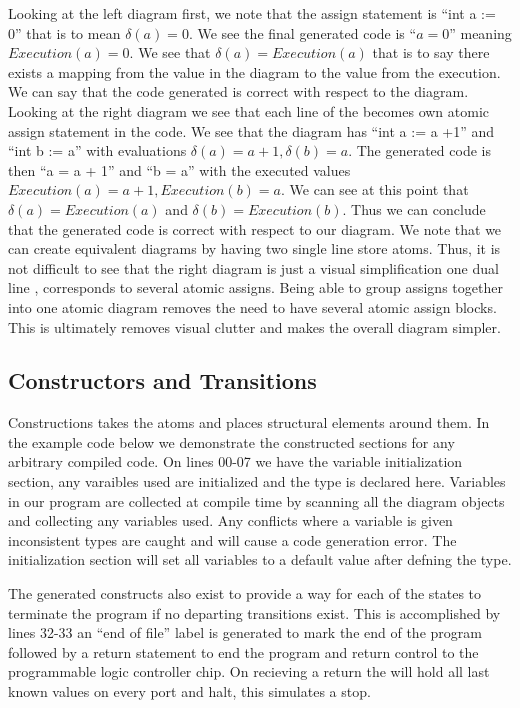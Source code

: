 Looking at the left diagram first, we note that the assign statement is ``int a := 0'' 
that is to mean $\delta(a) = 0$. We see the final generated code is ``$a = 0$'' 
meaning $Execution(a) = 0$. We see that $\delta(a) = Execution(a)$ that is to 
say there exists a mapping from the value in the diagram to the value from the execution. 
We can say that the code generated is correct with respect to the diagram. 
Looking at the right diagram we see that each line of the  
becomes own atomic assign statement in the code. We see that the diagram 
has ``int a := a +1'' and ``int b := a'' with evaluations $\delta(a) = a + 1, \delta(b) = a$. 
The generated code is then ``a = a + 1'' and ``b = a'' with the executed values 
$Execution(a) = a + 1, Execution(b) = a$. We can see at this point that $\delta(a) = Execution(a)$ 
and $\delta(b) = Execution(b)$. Thus we can conclude that the  
generated code is correct with respect to our diagram. We note that we can create equivalent 
diagrams by having two single line store atoms. 
Thus, it is not difficult to see that the right diagram is just a visual simplification one dual 
line , corresponds to several atomic assigns. Being able to group 
assigns together into one atomic diagram removes the need to have several atomic assign blocks.
This is ultimately removes visual clutter and makes the overall diagram simpler.


\subsection{Constructors and Transitions}

Constructions takes the atoms and places structural elements around them. 
In the example code below we demonstrate the constructed sections for any arbitrary 
compiled code. On lines 00-07 we have the variable initialization section, 
any varaibles used are initialized and the type is declared here.
Variables in our program are collected at compile time by scanning all the diagram 
objects and collecting any variables used. Any conflicts where a variable is given inconsistent types
are caught and will cause a code generation error. The initialization section will 
set all variables to a default value after defning the type.

The generated constructs also exist to provide a way for each of the states to terminate the program
if no departing transitions exist. This is accomplished by lines 32-33 an ``end of file'' label 
is generated to mark the end of the program followed by a return statement to end the 
program and return control to the programmable logic controller chip. On recieving a 
return the  will hold all last known values 
on every port and halt, this simulates a stop.


